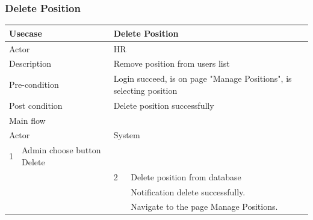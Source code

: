 \documentclass[a4paper]{article}
\begin{document}
\subsubsection{Delete Position}
\begin{tabular}{|l|p{5cm}||l|p{5cm}|}
	\hline 
	\multicolumn{2}{|p{5cm}|}{Usecase} & \multicolumn{2}{|p{5cm}|}{Delete Position}\\ 
	\hline 
	\multicolumn{2}{|p{5cm}|}{Actor} & \multicolumn{2}{|p{5cm}|}{HR} \\ 
	\hline 
	\multicolumn{2}{|p{5cm}|}{Description} & \multicolumn{2}{|p{5cm}|}{Remove position from users list}\\
	\hline
	\multicolumn{2}{|p{5cm}|}{Pre-condition} & \multicolumn{2}{|p{5cm}|}{Login succeed, is on page "Manage Positions", is selecting position}\\
	\hline
	\multicolumn{2}{|p{5cm}|}{Post condition} & \multicolumn{2}{|p{5cm}|}{Delete position successfully} \\
	\hline
	\multicolumn{4}{|l|}{Main flow} \\
	\hline
	\multicolumn{2}{|p{5cm}|}{Actor} & \multicolumn{2}{|p{5cm}|}{System} \\
	\hline
	1 & Admin choose button Delete & & \\
	\hline
	& & 2 & Delete position from database \\
	& &  &Notification delete successfully.\\
	& & &Navigate to the page Manage Positions. \\	
	\hline 	
\end{tabular}
\end{document}
